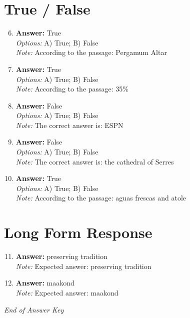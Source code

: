 \documentclass[12pt]{article}
\begin{document}
\section*{True / False}
\begin{enumerate}[label=\arabic*.]
\setcounter{enumi}{5}
\item \textbf{Answer:} True
\\ \textit{Options:} A) True; B) False
\\ \textit{Note:} According to the passage: Pergamum Altar
\item \textbf{Answer:} True
\\ \textit{Options:} A) True; B) False
\\ \textit{Note:} According to the passage: 35\%
\item \textbf{Answer:} False
\\ \textit{Options:} A) True; B) False
\\ \textit{Note:} The correct answer is: ESPN
\item \textbf{Answer:} False
\\ \textit{Options:} A) True; B) False
\\ \textit{Note:} The correct answer is: the cathedral of Serres
\item \textbf{Answer:} True
\\ \textit{Options:} A) True; B) False
\\ \textit{Note:} According to the passage: aguas frescas and atole
\end{enumerate}

\section*{Long Form Response}
\begin{enumerate}[label=\arabic*.]
\setcounter{enumi}{10}
\item \textbf{Answer:} preserving tradition
\\ \textit{Note:} Expected answer: preserving tradition
\item \textbf{Answer:} maakond
\\ \textit{Note:} Expected answer: maakond
\end{enumerate}

\vfill
\noindent\textit{End of Answer Key}
\end{document}
